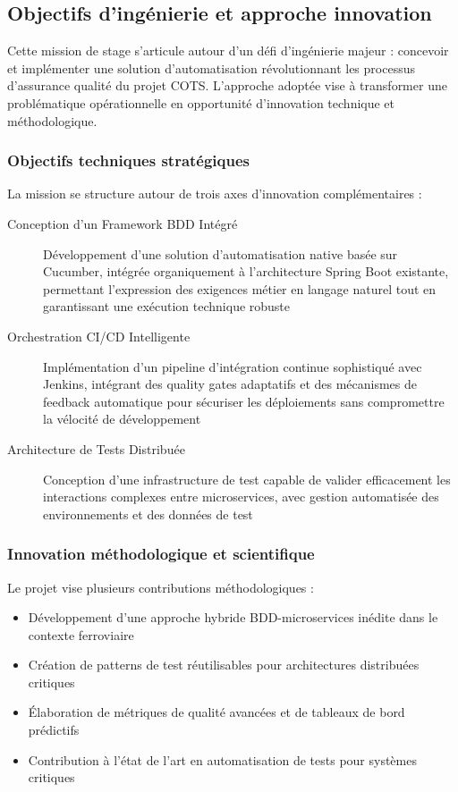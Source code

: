 \subsection{Objectifs d'ingénierie et approche innovation}

Cette mission de stage s'articule autour d'un défi d'ingénierie majeur : concevoir et implémenter une solution d'automatisation révolutionnant les processus d'assurance qualité du projet COTS. L'approche adoptée vise à transformer une problématique opérationnelle en opportunité d'innovation technique et méthodologique.

\subsubsection{Objectifs techniques stratégiques}

La mission se structure autour de trois axes d'innovation complémentaires :

\begin{description}
    \item[Conception d'un Framework BDD Intégré] Développement d'une solution d'automatisation native basée sur Cucumber, intégrée organiquement à l'architecture Spring Boot existante, permettant l'expression des exigences métier en langage naturel tout en garantissant une exécution technique robuste
    \item[Orchestration CI/CD Intelligente] Implémentation d'un pipeline d'intégration continue sophistiqué avec Jenkins, intégrant des quality gates adaptatifs et des mécanismes de feedback automatique pour sécuriser les déploiements sans compromettre la vélocité de développement
    \item[Architecture de Tests Distribuée] Conception d'une infrastructure de test capable de valider efficacement les interactions complexes entre microservices, avec gestion automatisée des environnements et des données de test
\end{description}

\subsubsection{Innovation méthodologique et scientifique}

Le projet vise plusieurs contributions méthodologiques :
\begin{itemize}
    \item Développement d'une approche hybride BDD-microservices inédite dans le contexte ferroviaire
    \item Création de patterns de test réutilisables pour architectures distribuées critiques
    \item Élaboration de métriques de qualité avancées et de tableaux de bord prédictifs
    \item Contribution à l'état de l'art en automatisation de tests pour systèmes critiques
\end{itemize}

